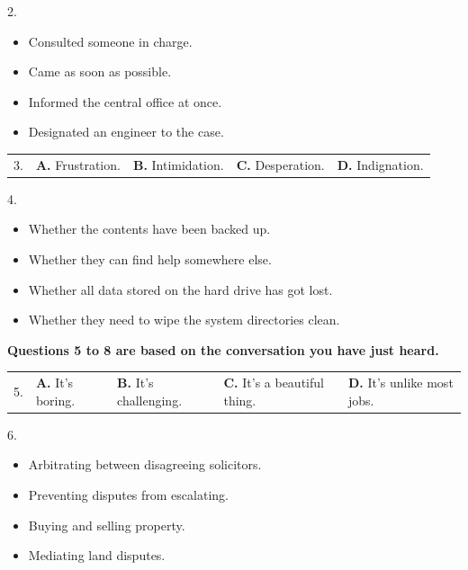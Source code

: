 \documentclass[UTF8,11pt]{ctexart}
\begin{document}
2.


\begin{itemize}[leftmargin=2em,itemsep=.2em,topsep=.4em]\item[A.] Consulted someone in charge.
\item[B.] Came as soon as possible.
\item[C.] Informed the central office at once.
\item[D.] Designated an engineer to the case.
\end{itemize}

\noindent\begin{tabularx}{\linewidth}{@{}lXXXX@{}}3. & \textbf{A.} Frustration. & \textbf{B.} Intimidation. & \textbf{C.} Desperation. & \textbf{D.} Indignation.\\\end{tabularx}\par

4.


\begin{itemize}[leftmargin=2em,itemsep=.2em,topsep=.4em]\item[A.] Whether the contents have been backed up.
\item[B.] Whether they can find help somewhere else.
\item[C.] Whether all data stored on the hard drive has got lost.
\item[D.] Whether they need to wipe the system directories clean.
\end{itemize}

\textbf{Questions 5 to 8 are based on the conversation you have just heard.}


\noindent\begin{tabularx}{\linewidth}{@{}lXXXX@{}}5. & \textbf{A.} It’s boring. & \textbf{B.} It’s challenging. & \textbf{C.} It’s a beautiful thing. & \textbf{D.} It’s unlike most jobs.\\\end{tabularx}\par

6.


\begin{itemize}[leftmargin=2em,itemsep=.2em,topsep=.4em]\item[A.] Arbitrating between disagreeing solicitors.
\item[B.] Preventing disputes from escalating.
\item[C.] Buying and selling property.
\item[D.] Mediating land disputes.
\end{itemize}
\end{document}
